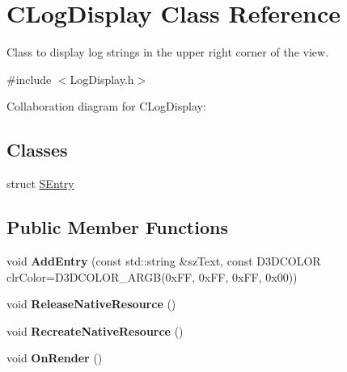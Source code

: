 \hypertarget{class_c_log_display}{\section{C\+Log\+Display Class Reference}
\label{class_c_log_display}
}


Class to display log strings in the upper right corner of the view.  




{\ttfamily \#include $<$Log\+Display.\+h$>$}



Collaboration diagram for C\+Log\+Display\+:
\subsection*{Classes}
\begin{DoxyCompactItemize}
\item 
struct \hyperlink{struct_c_log_display_1_1_s_entry}{S\+Entry}
\end{DoxyCompactItemize}
\subsection*{Public Member Functions}
\begin{DoxyCompactItemize}
\item 
\hypertarget{class_c_log_display_ad28c576fca44b930983b1cc1a16c8aa4}{void {\bfseries Add\+Entry} (const std\+::string \&sz\+Text, const D3\+D\+C\+O\+L\+O\+R clr\+Color=D3\+D\+C\+O\+L\+O\+R\+\_\+\+A\+R\+G\+B(0x\+F\+F, 0x\+F\+F, 0x\+F\+F, 0x00))}\label{class_c_log_display_ad28c576fca44b930983b1cc1a16c8aa4}

\item 
\hypertarget{class_c_log_display_ae28a8cab242ba01fb168757993797f0a}{void {\bfseries Release\+Native\+Resource} ()}\label{class_c_log_display_ae28a8cab242ba01fb168757993797f0a}

\item 
\hypertarget{class_c_log_display_a51d40e77e920deeadc7b24a85dfa60af}{void {\bfseries Recreate\+Native\+Resource} ()}\label{class_c_log_display_a51d40e77e920deeadc7b24a85dfa60af}

\item 
\hypertarget{class_c_log_display_a09c89d01e681dafeb4003bea211a0c30}{void {\bfseries On\+Render} ()}\label{class_c_log_display_a09c89d01e681dafeb4003bea211a0c30}

\end{DoxyCompactItemize}
